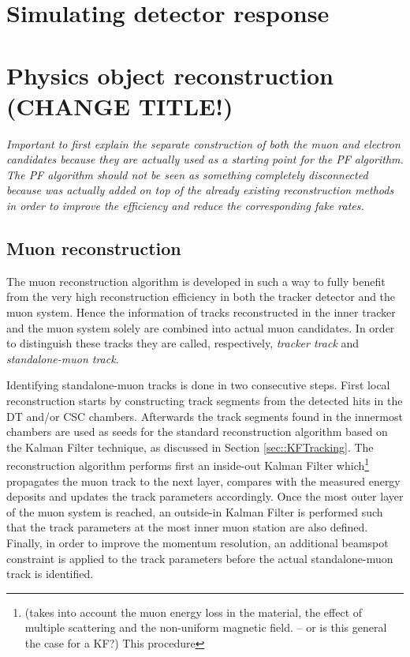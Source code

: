 \section{Simulating detector response} \label{sec::DetectorSim} %

\section{Physics object reconstruction (CHANGE TITLE!)} \label{sec::PhysicsObjects}

\textit{Important to first explain the separate construction of both the muon and electron candidates because they are actually used as a starting point for the PF algorithm. The PF algorithm should not be seen as something completely disconnected because was actually added on top of the already existing reconstruction methods in order to improve the efficiency and reduce the corresponding fake rates.}

\subsection{Muon reconstruction}\label{subsec::Muon}

The muon reconstruction algorithm is developed in such a way to fully benefit from the very high reconstruction efficiency in both the tracker detector and the muon system.
Hence the information of tracks reconstructed in the inner tracker and the muon system solely are combined into actual muon candidates. In order to distinguish these tracks they are called, respectively, \textit{tracker track} and \textit{standalone-muon track}.

Identifying standalone-muon tracks is done in two consecutive steps. First local reconstruction starts by constructing track segments from the detected hits in the DT and/or CSC chambers. Afterwards the track segments found in the innermost chambers are used as seeds for the standard reconstruction algorithm based on the Kalman Filter technique, as discussed in Section \ref{sec::KFTracking}. The reconstruction algorithm performs first an inside-out Kalman Filter which\footnote{ (takes into account the muon energy loss in the material, the effect of multiple scattering and the non-uniform magnetic field. -- or is this general the case for a KF?) This procedure} propagates the muon track to the next layer, compares with the measured energy deposits and updates the track parameters accordingly. Once the most outer layer of the muon system is reached, an outside-in Kalman Filter is performed such that the track parameters at the most inner muon station are also defined. Finally, in order to improve the momentum resolution, an additional beamspot constraint is applied to the track parameters before the actual standalone-muon track is identified.

